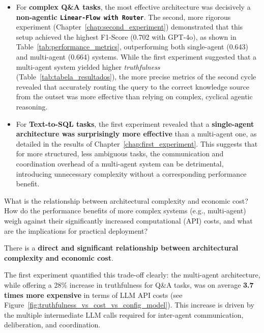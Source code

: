     \begin{itemize}
        \item For \textbf{complex Q\&A tasks}, the most effective architecture was decisively a \textbf{non-agentic \texttt{Linear-Flow with Router}}. The second, more rigorous experiment  (Chapter~\ref{chap:second_experiment}) demonstrated that this setup achieved the highest F1-Score (0.702 with GPT-4o), as shown in Table~\ref{tab:performance_metrics}, outperforming both single-agent (0.643) and multi-agent (0.664) systems. While the first experiment suggested that a multi-agent system yielded higher \textit{truthfulness} (Table~\ref{tab:tabela_resultados}), the more precise metrics of the second cycle revealed that accurately routing the query to the correct knowledge source from the outset was more effective than relying on complex, cyclical agentic reasoning.

        \item For \textbf{Text-to-SQL tasks}, the first experiment revealed that a \textbf{single-agent architecture was surprisingly more effective} than a multi-agent one, as detailed in the results of Chapter~\ref{chap:first_experiment}. This suggests that for more structured, less ambiguous tasks, the communication and coordination overhead of a multi-agent system can be detrimental, introducing unnecessary complexity without a corresponding performance benefit.
    \end{itemize}

    \vspace{\baselineskip}
    \begin{tcolorbox}[colback=gray!10, colframe=gray!40, title=\textbf{RQ2: Cost-Effectiveness}]
    What is the relationship between architectural complexity and economic cost? How do the performance benefits of more complex systems (e.g., multi-agent) weigh against their significantly increased computational (API) costs, and what are the implications for practical deployment?
    \end{tcolorbox}
    \vspace{\baselineskip}

    There is a \textbf{direct and significant relationship between architectural complexity and economic cost}.

    The first experiment quantified this trade-off clearly: the multi-agent architecture, while offering a 28\% increase in truthfulness for Q\&A tasks, was on average \textbf{3.7 times more expensive} in terms of LLM API costs (see Figure~\ref{fig:truthfulness_vs_cost_vs_config_model}). This increase is driven by the multiple intermediate LLM calls required for inter-agent communication, deliberation, and coordination.

